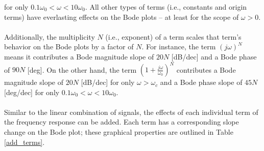 \documentclass{report}
\begin{document}
for only $0.1\omega_0 < \omega < 10\omega_0$. All other types of terms (i.e., constants and origin terms) have everlasting effects on the Bode plots -- at least for the scope of $\omega > 0$.
\\ \\ 
Additionally, the multiplicity $N$ (i.e., exponent) of a term scales that term's behavior on the Bode plots by a factor of $N$. For instance, the term $(j\omega)^N$ means it contributes a Bode magnitude slope of $20N$ [dB/dec] and 
a Bode phase of $90N$ [deg]. On the other hand, the term $\left(1+\frac{j\omega}{\omega_0}\right)^N$ contributes a Bode magnitude slope of $20N$ [dB/dec] for only $\omega>\omega_c$ and a Bode phase slope of $45N$ [deg/dec] for only 
$0.1\omega_0<\omega<10\omega_0$.
\\ \\
Similar to the linear combination of signals, the effects of each individual term of the frequency response can be added. Each term has a corresponding slope change on the Bode plot; these graphical properties 
are outlined in Table \ref{add_terms}.
\begin{table}
    \small
    \centering
    \caption{Graphical Properties of Frequency Response Terms on the Bode Plot}
    \label{add_terms}
\end{table}
\end{document}
